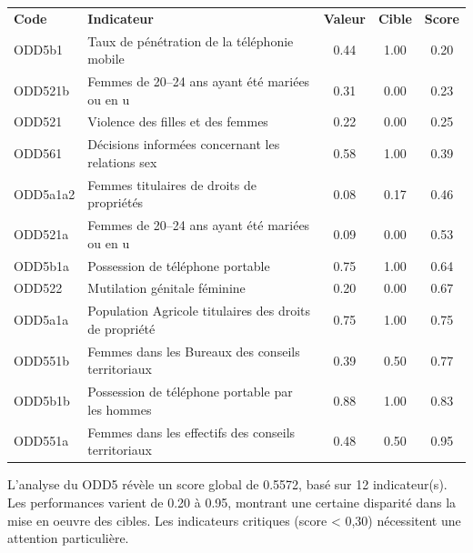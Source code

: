 \begin{table}[H]
	\centering
	\begin{tabularx}{\textwidth}{l l c c c}
		\rowcolor[HTML]{003D82}
		\color{white}\textbf{Code} & \color{white}\textbf{Indicateur} & \color{white}\textbf{Valeur} & \color{white}\textbf{Cible} & \color{white}\textbf{Score} \\
		\rowcolor[HTML]{F5F8FC}
		ODD5b1 & Taux de pénétration de la téléphonie mobile & 0.44 & 1.00 & 0.20 \\
		\rowcolor[HTML]{E8F0FF}
		ODD521b & Femmes de 20–24 ans ayant été mariées ou en u & 0.31 & 0.00 & 0.23 \\
		\rowcolor[HTML]{F5F8FC}
		ODD521 & Violence des filles et des femmes & 0.22 & 0.00 & 0.25 \\
		\rowcolor[HTML]{E8F0FF}
		ODD561 & Décisions informées concernant les relations sex & 0.58 & 1.00 & 0.39 \\
		\rowcolor[HTML]{F5F8FC}
		ODD5a1a2 & Femmes titulaires de droits de propriétés & 0.08 & 0.17 & 0.46 \\
		\rowcolor[HTML]{E8F0FF}
		ODD521a & Femmes de 20–24 ans ayant été mariées ou en u & 0.09 & 0.00 & 0.53 \\
		\rowcolor[HTML]{F5F8FC}
		ODD5b1a & Possession de téléphone portable & 0.75 & 1.00 & 0.64 \\
		\rowcolor[HTML]{E8F0FF}
		ODD522 & Mutilation génitale féminine & 0.20 & 0.00 & 0.67 \\
		\rowcolor[HTML]{F5F8FC}
		ODD5a1a & Population Agricole titulaires des droits de propriété & 0.75 & 1.00 & 0.75 \\
		\rowcolor[HTML]{E8F0FF}
		ODD551b & Femmes dans les Bureaux des conseils territoriaux & 0.39 & 0.50 & 0.77 \\
		\rowcolor[HTML]{F5F8FC}
		ODD5b1b & Possession de téléphone portable par les hommes & 0.88 & 1.00 & 0.83 \\
		\rowcolor[HTML]{E8F0FF}
		ODD551a & Femmes dans les effectifs des conseils territoriaux & 0.48 & 0.50 & 0.95 \\
	\end{tabularx}
\end{table}

L'analyse du ODD5 révèle un score global de 0.5572, basé sur 12 indicateur(s). Les performances varient de 0.20 à 0.95, montrant une certaine disparité dans la mise en oeuvre des cibles. Les indicateurs critiques (score < 0,30) nécessitent une attention particulière.


